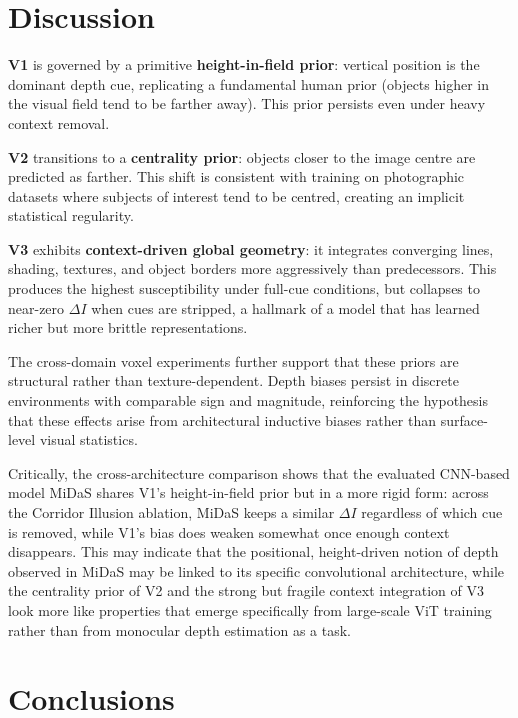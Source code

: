 \documentclass[10pt,twocolumn]{article}
\begin{document}
\section{Discussion}
\label{sec:discussion}

\textbf{V1} is governed by a primitive \textbf{height-in-field prior}: vertical position is
the dominant depth cue, replicating a fundamental human prior (objects higher in the
visual field tend to be farther away). This prior persists even under heavy context removal.

\textbf{V2} transitions to a \textbf{centrality prior}: objects closer to the image centre
are predicted as farther. This shift is consistent with training on photographic datasets
where subjects of interest tend to be centred, creating an implicit statistical regularity.

\textbf{V3} exhibits \textbf{context-driven global geometry}: it integrates converging
lines, shading, textures, and object borders more aggressively than predecessors. This
produces the highest susceptibility under full-cue conditions, but collapses to near-zero
$\Delta I$ when cues are stripped, a hallmark of a model that has learned richer but
more brittle representations.

The cross-domain voxel experiments further support that these priors are structural rather than texture-dependent. Depth biases persist in discrete environments with comparable sign and magnitude, reinforcing the hypothesis that these effects arise from architectural inductive biases rather than surface-level visual statistics.

Critically, the cross-architecture comparison shows that the evaluated CNN-based model MiDaS shares V1's
height-in-field prior but in a more rigid form: across the Corridor Illusion
ablation, MiDaS keeps a similar $\Delta I$ regardless of which cue is removed,
while V1's bias does weaken somewhat once enough context disappears.  This may indicate that the positional, height-driven notion of depth observed in MiDaS may be linked to its specific convolutional architecture, while the centrality prior of V2 and
the strong but fragile  context integration of V3 look more like properties that
emerge specifically from large-scale ViT training rather than from monocular
depth estimation as a task.

\section{Conclusions}
\label{sec:conclusions}
\end{document}
